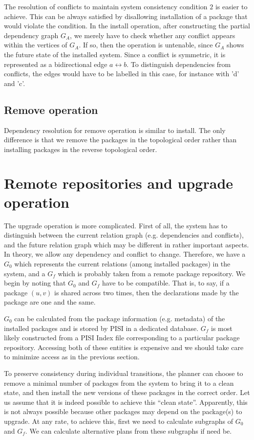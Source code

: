 \documentclass[a4paper,11pt]{article}
\begin{document}
The resolution of conflicts to maintain system consistency condition
$2$ is easier to achieve. This can be always satisfied by disallowing
installation of a package that would violate the condition. In the
install operation, after constructing the partial dependency graph
$G_A$, we merely have to check whether any conflict appears within the
vertices of $G_A$. If so, then the operation is untenable, since $G_A$
shows the future state of the installed system. Since a conflict is
symmetric, it is represented as a bidirectional edge $a \leftrightarrow b$. To
distinguish dependencies from conflicts, the edges would have to be
labelled in this case, for instance with 'd' and 'c'.

\subsection{Remove operation}

Dependency resolution for remove operation is similar to install.  The
only difference is that we remove the packages in the topological order rather
than installing packages in the reverse topological order.

\section{Remote repositories and upgrade operation}
 

The upgrade operation is more complicated. First of all, the system
has to distinguish between the current relation graph (e.g.
dependencies and conflicts), and the future relation graph which may
be different in rather important aspects. In theory, we allow any
dependency and conflict to change. Therefore, we have a $G_0$ which
represents the current relations (among installed packages) in the
system, and a $G_f$ which is probably taken from a remote package
repository. We begin by noting that $G_0$ and $G_f$ have to be
compatible. That is, to say, if a package $(u,v)$ is shared across two
times, then the declarations made by the package are one and the same.

$G_0$ can be calculated from the package information (e.g. metadata)
of the installed packages and is stored by PISI in a dedicated
database. $G_f$ is most likely constructed from a PISI Index file
corresponding to a particular package repository. Accessing both of
these entities is expensive and we should take care to minimize access
as in the previous section.

To preserve consistency during individual transitions, the planner can
choose to remove a minimal number of packages from the system to bring
it to a clean state, and then install the new versions of these
packages in the correct order. Let us assume that it is indeed
possible to achieve this ``clean state''. Apparently, this is not
always possible because other packages may depend on the package(s) to
upgrade. At any rate, to achieve this, first we need to
calculate subgraphs of $G_0$ and $G_f$. We can calculate alternative
plans from these subgraphs if need be.
\end{document}
